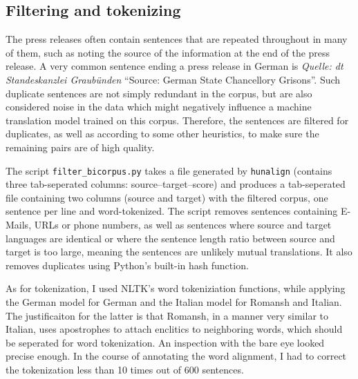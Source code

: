 \subsection{Filtering and tokenizing}
The press releases often contain sentences that are repeated throughout in many of them, such as noting the source of the information at the end of the press release. 
A very common sentence ending a press release in German is \emph{Quelle: dt Standeskanzlei Graubünden} \enquote{Source: German State Chancellory Grisons}. 
Such duplicate sentences are not simply redundant in the corpus, but are also considered noise in the data which might negatively influence a machine translation model trained on this corpus. 
Therefore, the sentences are filtered for duplicates, as well as according to some other heuristics, to make sure the remaining pairs are of high quality.

The script \texttt{filter\_bicorpus.py} takes a file generated by \texttt{hunalign} (contains three tab-seperated columns: source--target--score) and produces a tab-seperated file containing two columns (source and target) with the filtered corpus, one sentence per line and word-tokenized. 
The script removes sentences containing E-Mails, URLs or phone numbers, as well as sentences where source and target languages are identical or where the sentence length ratio between source and target is too large, meaning the sentences are unlikely mutual translations.
It also removes duplicates using Python's built-in hash function.

As for tokenization, I used NLTK's word tokeniziation functions, while applying the German model for German and the Italian model for Romansh and Italian. 
The justificaiton for the latter is that Romansh, in a manner very similar to Italian, uses apostrophes to attach enclitics to neighboring words, which should be seperated for word tokenization. 
An inspection with the bare eye looked precise enough. 
In the course of annotating the word alignment, I had to correct the tokenization less than 10 times out of 600 sentences.





